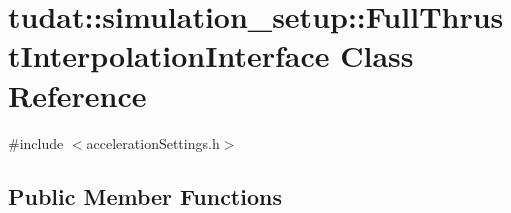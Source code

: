 \hypertarget{classtudat_1_1simulation__setup_1_1FullThrustInterpolationInterface}{}\section{tudat\+:\+:simulation\+\_\+setup\+:\+:Full\+Thrust\+Interpolation\+Interface Class Reference}
\label{classtudat_1_1simulation__setup_1_1FullThrustInterpolationInterface}


{\ttfamily \#include $<$acceleration\+Settings.\+h$>$}

\subsection*{Public Member Functions}
